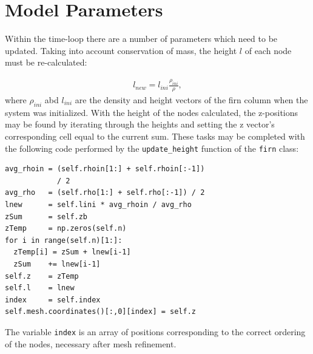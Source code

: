 \documentclass{article}%
\begin{document}
\section{Model Parameters}

Within the time-loop there are a number of parameters which need to be updated.  Taking into account conservation of mass, the height $l$ of each node must be re-calculated:\par
\begin{align*}
  l_{new} = l_{ini} \frac{\rho_{ini}}{\rho},
\end{align*}
where $\rho_{ini}$ abd $l_{ini}$ are the density and height vectors of the firn column when the system was initialized.  With the height of the nodes calculated, the z-positions may be found by iterating through the heights and setting the z vector's corresponding cell equal to the current sum.  These tasks may be completed with the following code performed by the \texttt{update\_height} function of the \texttt{firn} class:\par
\footnotesize
\begin{verbatim}
avg_rhoin = (self.rhoin[1:] + self.rhoin[:-1])
            / 2
avg_rho   = (self.rho[1:] + self.rho[:-1]) / 2
lnew      = self.lini * avg_rhoin / avg_rho
zSum      = self.zb
zTemp     = np.zeros(self.n)
for i in range(self.n)[1:]:
  zTemp[i] = zSum + lnew[i-1]
  zSum    += lnew[i-1]
self.z    = zTemp
self.l    = lnew
index     = self.index
self.mesh.coordinates()[:,0][index] = self.z
\end{verbatim}
\normalsize
The variable \texttt{index} is an array of positions corresponding to the correct ordering of the nodes, necessary after mesh refinement.  
\end{document}
